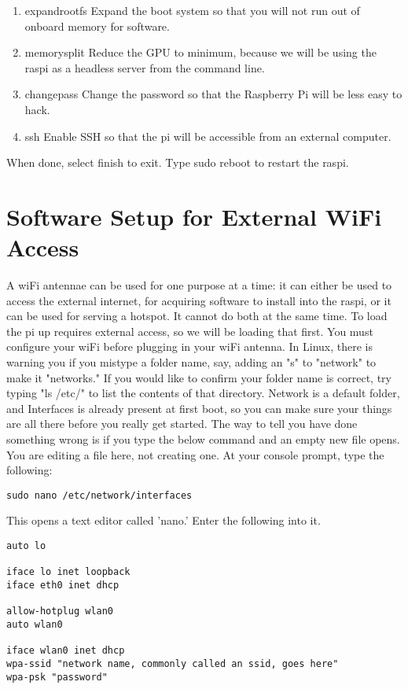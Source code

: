 \begin{enumerate}
\item expandrootfs Expand the boot system so that you will not run out of onboard memory for software.
\item memorysplit Reduce the GPU to minimum, because we will be using the raspi as a headless server from the command line.
\item changepass Change the password so that the Raspberry Pi will be less easy to hack.
\item ssh Enable SSH so that the pi will be accessible from an external computer.
\end{enumerate}

When done, select finish to exit.
Type sudo reboot to restart the raspi.

\section{Software Setup for External WiFi Access}
A wiFi antennae can be used for one purpose at a time: it can either be used to access the external internet, for acquiring software to install into the raspi, or it can be used for serving a hotspot. It cannot do both at the same time. To load the pi up requires external access, so we will be loading that first. You must configure your wiFi before plugging in your wiFi antenna. 
In Linux, there is warning you if you mistype a folder name, say, adding an "s" to "network" to make it "networks." If you would like to confirm your folder name is correct, try typing "ls /etc/" to list the contents of that directory. Network is a default folder, and Interfaces is already present at first boot, so you can make sure your things are all there before you really get started. The way to tell you have done something wrong is if you type the below command and an empty new file opens. You are editing a file here, not creating one.
 At your console prompt, type the following:

\begin{lstlisting}
sudo nano /etc/network/interfaces
\end{lstlisting}

This opens a text editor called 'nano.' Enter the following into it.
\begin{lstlisting}
auto lo

iface lo inet loopback
iface eth0 inet dhcp

allow-hotplug wlan0
auto wlan0

iface wlan0 inet dhcp
wpa-ssid "network name, commonly called an ssid, goes here"
wpa-psk "password"
\end{lstlisting}

